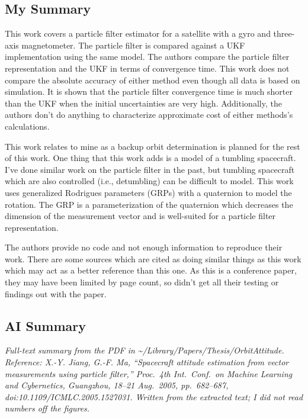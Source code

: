 \documentclass[11pt]{article}
\begin{document}
\subsection{My Summary} 

This work covers a particle filter estimator for a satellite with a gyro and three-axis magnetometer. The particle filter is compared against a UKF implementation using the same model. The authors compare the particle filter representation and the UKF in terms of convergence time. This work does not compare the absolute accuracy of either method even though all data is based on simulation. It is shown that the particle filter convergence time is much shorter than the UKF when the initial uncertainties are very high. Additionally, the authors don't do anything to characterize approximate cost of either methods's calculations.

This work relates to mine as a backup orbit determination is planned for the rest of this work. One thing that this work adds is a model of a tumbling spacecraft. I've done similar work on the particle filter in the past, but tumbling spacecraft which are also controlled (i.e., detumbling) can be difficult to model. This work uses generalized Rodrigues parameters (GRPs) with a quaternion to model the rotation. The GRP is a parameterization of the quaternion which decreases the dimension of the measurement vector and is well-suited for a particle filter representation.

The authors provide no code and not enough information to reproduce their work. There are some sources which are cited as doing similar things as this work which may act as a better reference than this one. As this is a conference paper, they may have been limited by page count, so didn't get all their testing or findings out with the paper. 

\subsection{AI Summary}

\textit{Full-text summary from the PDF in \textasciitilde/Library/Papers/Thesis/OrbitAttitude. Reference: X.-Y. Jiang, G.-F. Ma, ``Spacecraft attitude estimation from vector measurements using particle filter,'' Proc.\ 4th Int.\ Conf.\ on Machine Learning and Cybernetics, Guangzhou, 18--21 Aug.\ 2005, pp.\ 682--687, doi:10.1109/ICMLC.2005.1527031. Written from the extracted text; I did not read numbers off the figures.}
\end{document}
